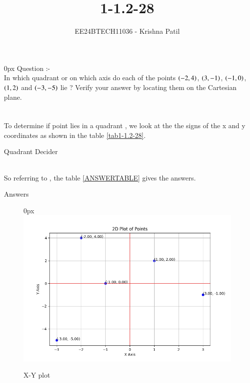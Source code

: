 \documentclass[journal]{IEEEtran}
\begin{document}

\vspace{3cm}

\title{1-1.2-28}
\author{EE24BTECH11036 - Krishna Patil}
{\let\newpage\relax\maketitle}

\renewcommand{\thefigure}{\theenumi}
\renewcommand{\thetable}{\theenumi}
\setlength{\intextsep}{10pt} %


\renewcommand{\thetable}{\theenumi}
\parindent 0px 
{Question :-} \\ 
 In which quadrant or on which axis do each of the points {$ \left(-2,4 \right)$}, {$ \left(3,-1\right) $}, {$ \left(-1,0\right) $}, {$ \left(1,2\right) $} and {$ \left(-3,-5\right) $} lie ? Verify your answer by locating them on the Cartesian plane. \\ \\
\solution \\
To determine if point lies in a quadrant , we look at the the signs of the x and y coordinates as shown in the table \ref{tab1-1.2-28}. \\
\begin{table}[h!]    
  \centering
  
  \caption{Quadrant Decider}
  \label{tab1-1.2-28}
\end{table} \\
So referring to  , the table \ref{ANSWERTABLE} gives the answers.
\begin{table}[h!]    
  \centering
  
  \caption{Answers}
  \label{ANSWERTABLE}
\end{table}
\begin{figure}[h!]
   \parindent 0px
   \includegraphics[width=1.0\linewidth]{Figure_1.png}
   \caption{X-Y plot}
   \label{x-yplot}
\end{figure}
\end{document}

